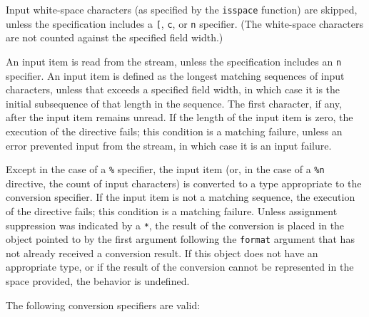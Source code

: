 Input white-space characters (as specified by the \texttt{isspace} function)
are skipped, unless the specification includes a \texttt{[}, \texttt{c}, or
\texttt{n} specifier. (The white-space characters are not counted against the
specified field width.)

An input item is read from the stream, unless the specification includes an
\texttt{n} specifier. An input item is defined as the longest matching
sequences of input characters, unless that exceeds a specified field width, in
which case it is the initial subsequence of that length in the sequence. The
first character, if any, after the input item remains unread. If the length of
the input item is zero, the execution of the directive fails; this condition is
a matching failure, unless an error prevented input from the stream, in which
case it is an input failure.

Except in the case of a \texttt{\%} specifier, the input item (or, in the case
of a \texttt{\%n} directive, the count of input characters) is converted to a
type appropriate to the conversion specifier. If the input item is not a
matching sequence, the execution of the directive fails; this condition is a
matching failure. Unless assignment suppression was indicated by a \texttt{*},
the result of the conversion is placed in the object pointed to by the first
argument following the \texttt{format} argument that has not already received a
conversion result. If this object does not have an appropriate type, or if the
result of the conversion cannot be represented in the space provided, the
behavior is undefined.

The following conversion specifiers are valid:

